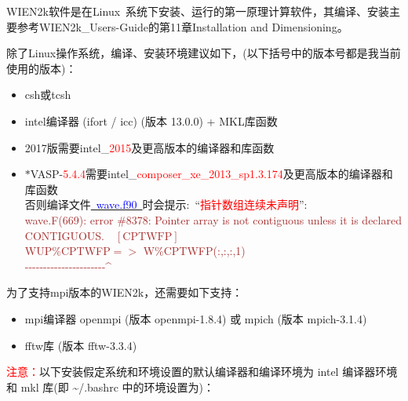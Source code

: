\documentclass[10pt,a4paper]{article}
\newcommand{\upcite}[1]{\hspace{0ex}\textsuperscript{\cite{#1}}} %
\begin{document}


\textrm{WIEN2k}软件是在\textrm{Linux~}系统下安装、运行的第一原理计算软件，其编译、安装主要参考\textrm{WIEN2k\_Users-Guide}\upcite{WIEN2K-UG_2001}的第\textrm{11}章\textrm{Installation and Dimensioning}。

除了\textrm{Linux}操作系统，编译、安装环境建议如下，(以下括号中的版本号都是我当前使用的版本)：\\
\begin{itemize}
	\item csh或tcsh
	\item intel编译器 (ifort / icc) (版本 13.0.0) + MKL库函数
	\item 2017版需要\textrm{intel\_\textcolor{red}{2015}}及更高版本的编译器和库函数
	\item $\ast$\textrm{VASP}-\textcolor{red}{5.4.4}需要\textrm{intel\_\textcolor{red}{composer\_xe\_2013\_sp1.3.174}}及更高版本的编译器和库函数\\
		否则编译文件\underline{\textcolor{blue}{~wave.f90~}}时会提示:~“\textcolor{red}{指针数组连续未声明}”:\\
		\textcolor{brown}{wave.F(669): error \#8378: Pointer array is not contiguous unless it is declared CONTIGUOUS.$\quad[\mathrm{CPTWFP}]$}\\
		\textcolor{brown}{WUP\%CPTWFP$=>$ W\%CPTWFP(:,:,:,1)}\\
		\textcolor{brown}{-{}-{}-{}-{}-{}-{}-{}-{}-{}-{}-{}-{}-{}-{}-{}-{}-{}-{}-{}-{}-{}-{}\^{}}
\end{itemize}

为了支持mpi版本的WIEN2k，还需要如下支持：
\begin{itemize}
	\item mpi编译器 openmpi (版本 openmpi-1.8.4) 或 mpich (版本 mpich-3.1.4) 
	\item fftw库 (版本 fftw-3.3.4)
\end{itemize}
\textcolor{red}{注意：}以下安装假定系统和环境设置的默认编译器和编译环境为 \textrm{intel} 编译器环境和 \textrm{mkl} 库(即 \~\//.bashrc 中的环境设置为)：
\end{document}
